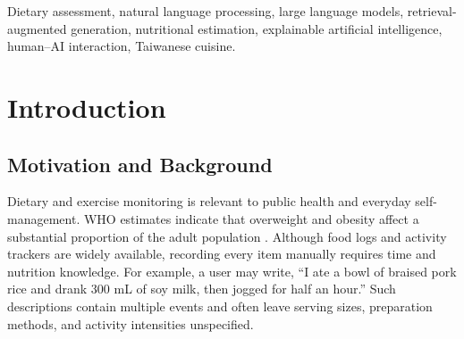 \documentclass[journal,10pt]{IEEEtran}
\begin{document}
\begin{abstract}
A primary contribution of this study is the development of a benchmark dataset comprising 500 Taiwanese dietary descriptions covering local dishes, street foods, lunchboxes, beverages, and home-cooked meals. Each entry is designed to associate colloquial expressions with ingredient composition, portion information, preparation methods, and reference nutritional values. The proposed system will be evaluated using this benchmark, targeting at least 85\% of calorie estimates within $\pm$20\% of their reference values. In addition, a seven-day usability study involving 20 participants will investigate whether DietSense can reduce dietary logging time by approximately 60\% compared with conventional manual tracking while achieving a System Usability Scale score of at least 70.

By separating semantic interpretation from numerical nutritional computation, DietSense aims to establish a transparent, auditable, and culturally contextualized framework for AI-assisted dietary assessment. The proposed approach has potential applications in personalized dietary management, chronic disease prevention, clinical nutrition support, and public health research.
\end{abstract}
\begin{IEEEkeywords}
Dietary assessment, natural language processing, large language models, retrieval-augmented generation, nutritional estimation, explainable artificial intelligence, human--AI interaction, Taiwanese cuisine.
\end{IEEEkeywords}
\section{Introduction}
\subsection{Motivation and Background}
Dietary and exercise monitoring is relevant to public health and everyday self-management. WHO estimates indicate that overweight and obesity affect a substantial proportion of the adult population \cite{who}. Although food logs and activity trackers are widely available, recording every item manually requires time and nutrition knowledge. For example, a user may write, ``I ate a bowl of braised pork rice and drank 300 mL of soy milk, then jogged for half an hour.'' Such descriptions contain multiple events and often leave serving sizes, preparation methods, and activity intensities unspecified.
\end{document}
